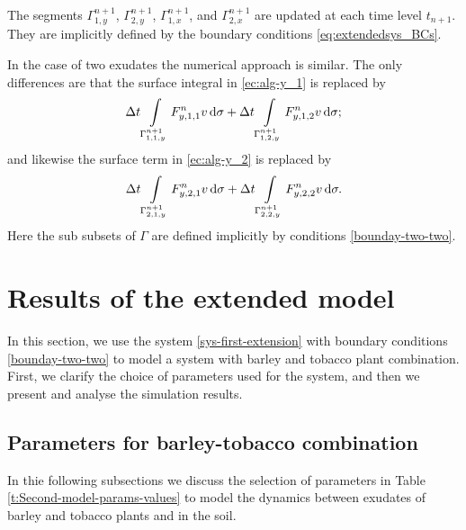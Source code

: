 \documentclass[11pt]{article}
\numberwithin{equation}{section}
\begin{document}
The segments \( \Gamma_{1,y}^{n+1}\), \(\Gamma_{2,y}^{n+1}\), \( \Gamma_{1,x}^{n+1}\), and \(\Gamma_{2,x}^{n+1}\) are updated at each time level \(t_{n+1}\). They are implicitly defined by the boundary conditions \eqref{eq:extendedsys_BCs}.


\vspace{1\baselineskip}
In the case of two exudates the numerical approach is similar. The only differences are that the surface integral in \eqref{ec:alg-y_1} is replaced by
\[
    \Delta t \int\limits_{\Gamma_{1,1,y}^{n+1}} F_{y,1,1}^n v \dif\sigma
    + \Delta t \int\limits_{\Gamma_{1,2,y}^{n+1}} F_{y,1,2}^n v \dif\sigma;
\]
and likewise the surface term in \eqref{ec:alg-y_2} is replaced by
\[
    \Delta t \int\limits_{\Gamma_{2,1,y}^{n+1}} F_{y,2,1}^n v \dif\sigma
    +\Delta t \int\limits_{\Gamma_{2,2,y}^{n+1}} F_{y,2,2}^n v \dif\sigma.
\]
Here the sub subsets of \(\Gamma\) are defined implicitly by conditions \eqref{bounday-two-two}.











\section{Results of the extended model}
\label{sec:Results_Extension}
In this section, we use the system \eqref{sys-first-extension} with boundary conditions \eqref{bounday-two-two} to model a system with barley and tobacco plant combination. First, we clarify the choice of parameters used for the system, and then we present and analyse the simulation results. 



\subsection{Parameters for barley-tobacco combination}
In thie following subsections we discuss the selection of parameters in Table \ref{t:Second-model-params-values} to model the dynamics between exudates of barley and tobacco plants and  in the soil.
\end{document}
